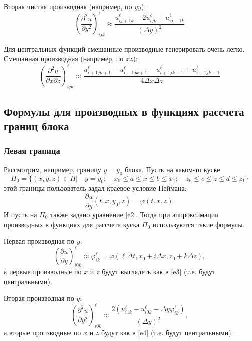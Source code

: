 \documentclass[a4paper]{article}
\begin{document}
Вторая чистая производная (например, по $yy$):
\begin{equation}\label{e4}
\left(\frac{\partial^2 u}{\partial y^2}\right)^{\ell}_{ijk} \approx \frac{u^{\ell}_{ij+1k} - 2u^{\ell}_{ijk} + u^{\ell}_{ij-1k}}{(\Delta y)^2}
\end{equation}

Для центральных функций смешанные производные генерировать очень легко. Смешанная производная (например, по $xz$):
\begin{equation}\label{e5}
\left(\frac{\partial^2 u}{\partial x\partial z}\right)^{\ell}_{ijk} \approx \frac{u^{\ell}_{i+1jk+1} - u^{\ell}_{i-1jk+1} - u^{\ell}_{i+1jk-1} + u^{\ell}_{i-1jk-1}}{4\Delta x\Delta z}
\end{equation}

\subsection{\Large Формулы для производных в функциях рассчета границ блока}\label{s2}
\subsubsection{\large Левая граница}
Рассмотрим, например, границу $y = y_0$ блока. Пусть на каком-то куске \[\Pi_0 = \{(x,y,z) \in \Pi|\quad y = y_0;\quad x_0 \leqslant a \leqslant x \leqslant b \leqslant x_1;\quad z_0 \leqslant c \leqslant z \leqslant d \leqslant z_1\}\] этой границы пользователь задал краевое условие Неймана:
\begin{equation*}
\frac{\partial u}{\partial y}(t,x,y_0,z) = \varphi(t,x,z).
\end{equation*}
И пусть на $\Pi_0$ также задано уравнение \eqref{e2}. Тогда при аппроксимации производных в функциях для рассчета куска $\Pi_0$ используются такие формулы.

Первая производная по $y$:
\begin{equation}\label{e6}
\left(\frac{\partial u}{\partial y}\right)^{\ell}_{i0k} \approx \varphi^{\ell}_{ik} = \varphi(\ell\Delta t, x_0 + i\Delta x, z_0 + k\Delta z),
\end{equation}
а первые производные по $x$ и $z$ будут выглядеть как в \eqref{e3} (т.е. будут центральными).

Вторая производная по $y$:
\begin{equation*}
\left(\frac{\partial^2 u}{\partial y^2}\right)^{\ell}_{i0k} \approx \frac{2\left(u^{\ell}_{i1k} - u^{\ell}_{i0k} - \Delta y  \varphi^{\ell}_{ik}\right)}{(\Delta y)^2},
\end{equation*}
а вторые производные по $x$ и $z$ будут как в \eqref{e4} (т.е. будут центральными).
\end{document}
